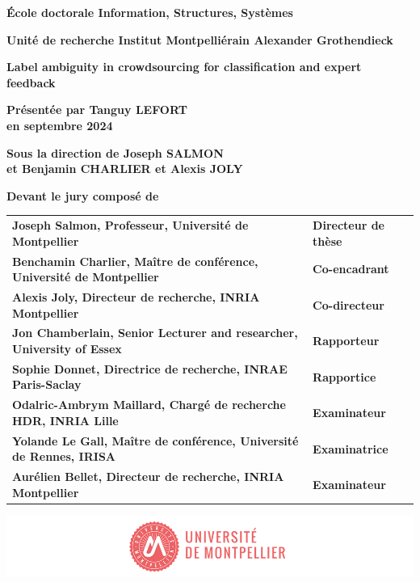 \documentclass[
a4paper, %
12pt]{book}
\begin{document}
\begin{titlepage}
{\bigskip
\textbf{École doctorale Information, Structures, Systèmes}

\bigskip
\textbf{Unité de recherche Institut Montpelliérain Alexander Grothendieck}


\color{Titleblue}
\fontsize{17}{20.4}\selectfont
\vspace{2cm}
\textbf{Label ambiguity in crowdsourcing for classification and
expert feedback}


\vspace{4cm}
\fontsize{15}{18}\selectfont
\color{black}
\textbf{Présentée par Tanguy LEFORT\\
en septembre 2024}

\bigskip
\fontsize{13}{15.6}\selectfont
\textbf{Sous la direction de Joseph SALMON\\
et Benjamin CHARLIER et Alexis JOLY}

\vspace{1.5cm}
\normalsize
\textbf{Devant le jury composé de}\\
\bigskip
\fontsize{10}{12}\selectfont
\vspace{1.5mm}
\begin{tabular}{p{14cm}l}
\textbf{Joseph Salmon, Professeur, Université de Montpellier} & \textbf{Directeur de thèse} \\
\textbf{Benchamin Charlier, Maître de conférence, Université de Montpellier} & \textbf{Co-encadrant} \\
\textbf{Alexis Joly, Directeur de recherche, INRIA Montpellier} & \textbf{Co-directeur} \\
\textbf{Jon Chamberlain, Senior Lecturer and researcher, University of Essex} & \textbf{Rapporteur} \\
\textbf{Sophie Donnet, Directrice de recherche, INRAE Paris-Saclay} & \textbf{Rapportice} \\
\textbf{Odalric-Ambrym Maillard, Chargé de recherche HDR, INRIA Lille} & \textbf{Examinateur} \\
\textbf{Yolande Le Gall, Maître de conférence, Université de Rennes, IRISA} & \textbf{Examinatrice} \\
\textbf{Aurélien Bellet, Directeur de recherche, INRIA Montpellier} & \textbf{Examinateur} \\

\end{tabular}

\vspace{\fill}
\includegraphics[scale=1]{images/PhD_Couverture_LogoUM.png}
\vspace{-15mm}}
\end{titlepage}


% 
\end{document}

